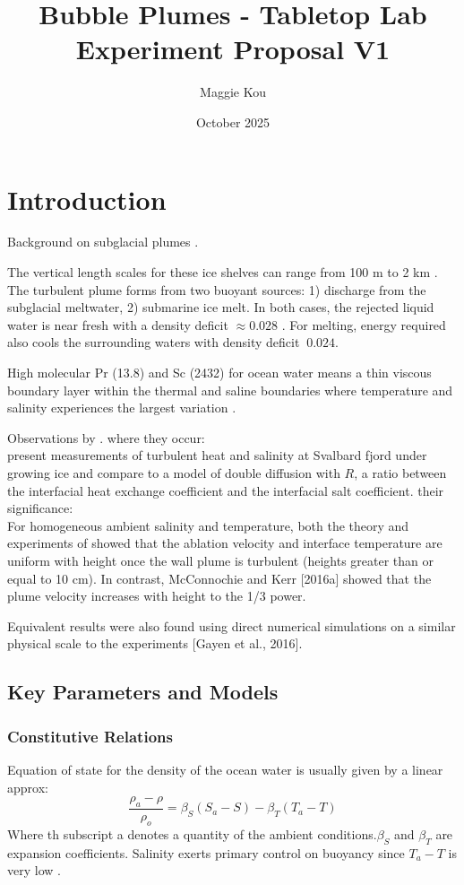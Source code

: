 \documentclass{article}
\title{Bubble Plumes - Tabletop Lab Experiment Proposal V1}
\author{Maggie Kou}
\date{October 2025}
\begin{document}
\maketitle

\section{Introduction}
Background on subglacial plumes \citep{hewitt_subglacial_2020}. 

The vertical length scales for these ice shelves can range from 100 m to 2 km \citep{jenkins_observation_2010}.
The turbulent plume forms from two buoyant sources: 1) discharge from the subglacial meltwater, 2) submarine ice melt. In both cases, the rejected liquid water is near fresh with a density deficit $\approx 0.028$ \citep{hewitt_subglacial_2020}. For melting, energy required also cools the surrounding waters with density deficit $~ 0.024$.

High molecular Pr (13.8) and Sc (2432) for ocean water means a thin viscous boundary layer within the thermal and saline boundaries where temperature and salinity experiences the largest variation \citep{steele_role_1989}. 

Observations by \citep{shepherd_warm_2004}. where they occur: \\
\cite{mcphee_revisiting_2008} present measurements of turbulent heat and salinity at Svalbard fjord under growing ice and compare to a model of double diffusion with $R$, a ratio between the interfacial heat exchange coefficient and the interfacial salt coefficient. 
their significance: \\

For homogeneous ambient salinity and temperature, both the theory and experiments of \cite{kerr_dissolution_2015} showed that the ablation velocity and interface temperature are uniform with height once the wall plume is turbulent (heights greater than or equal to 10 cm). In contrast, McConnochie and Kerr [2016a] showed that the plume velocity increases with height to the 1/3 power. 

Equivalent results were also found using direct numerical simulations on a similar physical scale to the experiments [Gayen et al., 2016]. 

\subsection{Key Parameters and Models}

\subsubsection{Constitutive Relations}
Equation of state for the density of the ocean water is usually given by a linear approx:
\[\frac{\rho_a - \rho}{\rho_o} = \beta_S (S_a - S) - \beta_T (T_a - T)\]
Where th subscript a denotes a quantity of the ambient conditions.$\beta_S$ and $\beta_T$ are expansion coefficients. Salinity exerts primary control on buoyancy since $T_a - T$ is very low \citep{hewitt_subglacial_2020}.
\end{document}
